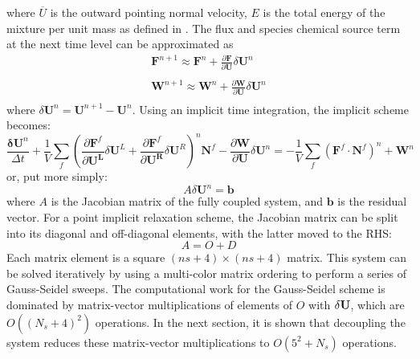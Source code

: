 where $\overline{U}$ is the outward pointing normal velocity, $E$ is
the total energy of the mixture per unit mass as defined in
.  The flux and species chemical
source term at the next time level can be approximated as
\begin{equation}
	\begin{matrix}
		\mathbf{F}^{n+1} \approx \mathbf{F}^n+\frac{\partial \mathbf{F}}{\partial \mathbf{U}}\delta\mathbf{U}^n \\
		\\
		\mathbf{W}^{n+1} \approx \mathbf{W}^n+\frac{\partial \mathbf{W}}{\partial \mathbf{U}}\delta\mathbf{U}^n \\
	\end{matrix}
  \label{fc-fluxes-timelevel}
\end{equation}
where $\delta\mathbf{U}^n = \mathbf{U}^{n+1}- \mathbf{U}^{n}$.  Using an
implicit time integration, the implicit scheme becomes:
\begin{equation}
	\frac{\mathbf{\delta U}^n}{\Delta t}+\frac{1}{V}\sum\limits_{f}(\frac{\partial \mathbf{F}^f}{\partial \mathbf{U^L}}\delta\mathbf{U}^L
	+\frac{\partial \mathbf{F}^f}{\partial \mathbf{U^R}}\delta\mathbf{U}^R)^n \mathbf{N}^f
	- \frac{\partial \mathbf{W}}{\partial \mathbf{U}}\delta\mathbf{U}^n
	= -\frac{1}{V}\sum\limits_{f}(\mathbf{F}^f\cdot\mathbf{N}^f)^n + \mathbf{W}^n
\end {equation}
or, put more simply:
\begin{equation}
	A\delta\mathbf{U}^n = \mathbf{b}
\end{equation}
where $A$ is the Jacobian matrix of the fully coupled system, and $\mathbf{b}$
is the residual vector.  For a point implicit relaxation scheme, the Jacobian
matrix can be split into its diagonal and off-diagonal elements, with the latter
moved to the RHS:
\begin{equation}
\label{decomp-jac}
	A=O+D
\end{equation}
Each matrix element is a square $(ns+4)\times(ns+4)$ matrix.  This system can
be solved iteratively by using a multi-color matrix ordering to perform a series
of Gauss-Seidel sweeps. The computational work for the Gauss-Seidel scheme is
dominated by matrix-vector multiplications of elements of $O$ with
$\delta \mathbf U$, which are $O((N_s + 4)^2)$ operations.  In the next
section, it is shown that decoupling the system reduces these matrix-vector
multiplications to $O(5^2 + N_s)$ operations.

